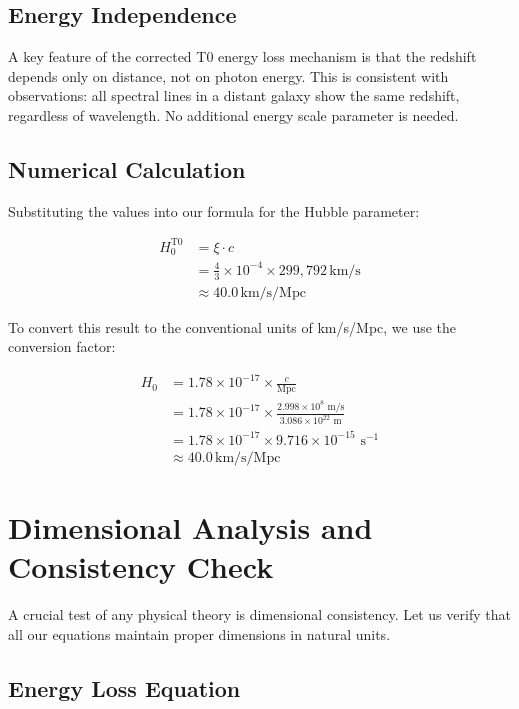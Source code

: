 	\subsection{Energy Independence}
	
	A key feature of the corrected T0 energy loss mechanism is that the redshift depends only on distance, not on photon energy. This is consistent with observations: all spectral lines in a distant galaxy show the same redshift, regardless of wavelength. No additional energy scale parameter is needed.

	\subsection{Numerical Calculation}
	
	Substituting the values into our formula for the Hubble parameter:
	
	\begin{align}
		H_0^{\text{T0}} &= \xi \cdot c \\
		&= \frac{4}{3} \times 10^{-4} \times 299{,}792\,\text{km/s} \\
		&\approx 40.0\,\text{km/s/Mpc}
	\end{align}
	
	To convert this result to the conventional units of km/s/Mpc, we use the conversion factor:
	
	\begin{align}
		H_0 &= 1.78 \times 10^{-17} \times \frac{c}{\text{Mpc}} \\
		&= 1.78 \times 10^{-17} \times \frac{2.998 \times 10^8 \text{ m/s}}{3.086 \times 10^{22} \text{ m}} \\
		&= 1.78 \times 10^{-17} \times 9.716 \times 10^{-15} \text{ s}^{-1} \\
		&\approx 40.0\,\text{km/s/Mpc}
	\end{align}
	
	\section{Dimensional Analysis and Consistency Check}
	
	A crucial test of any physical theory is dimensional consistency. Let us verify that all our equations maintain proper dimensions in natural units.
	
	\subsection{Energy Loss Equation}
	
